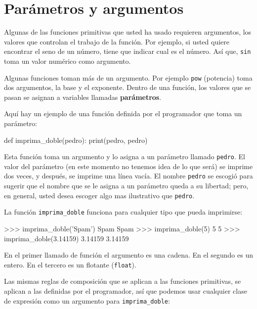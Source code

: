 \section{Parámetros y argumentos}
\label{parameters}

Algunas de las funciones primitivas que usted ha usado requieren argumentos,
los valores que controlan el trabajo de la función. Por ejemplo, si usted
quiere encontrar el seno de un número, tiene que indicar cual es el número.
Así que, \texttt{sin} toma un valor numérico como argumento.

Algunas funciones toman más de un argumento. Por ejemplo  \texttt{pow} 
(potencia) toma dos argumentos, la base y el exponente.  Dentro de una función,
los valores que se pasan se asignan a variables llamadas  {\bf parámetros}.

Aquí hay un ejemplo de una función definida por el programador que toma un 
parámetro:

\beforeverb
\begin{pythoncode}
def imprima_doble(pedro):
  print(pedro, pedro)
\end{pythoncode}
\afterverb
%

Esta función toma un argumento y lo asigna a un parámetro llamado 
\texttt{pedro}. El valor del parámetro (en este momento no tenemos idea de lo 
que será) se imprime dos veces, y después, se imprime una línea vacía.
El nombre \texttt{pedro} se escogió para sugerir que el nombre que se le asigna 
a un parámetro queda a su libertad; pero, en general, usted desea escoger algo 
mas ilustrativo que \texttt{pedro}.

La función  \texttt{imprima\_doble} funciona para cualquier tipo que pueda
imprimirse:

\beforeverb
\begin{pyconcode}
>>> imprima_doble('Spam')
Spam Spam
>>> imprima_doble(5)
5 5
>>> imprima_doble(3.14159)
3.14159 3.14159
\end{pyconcode}
\afterverb
%

En el primer llamado de función el argumento es una cadena. En el segundo es 
un entero. En el tercero es un flotante (\texttt{float}).

Las mismas reglas de composición que se aplican a las funciones primitivas,
se aplican a las definidas por el programador, así que podemos
usar cualquier clase de expresión como un argumento para  
\texttt{imprima\_doble}:

